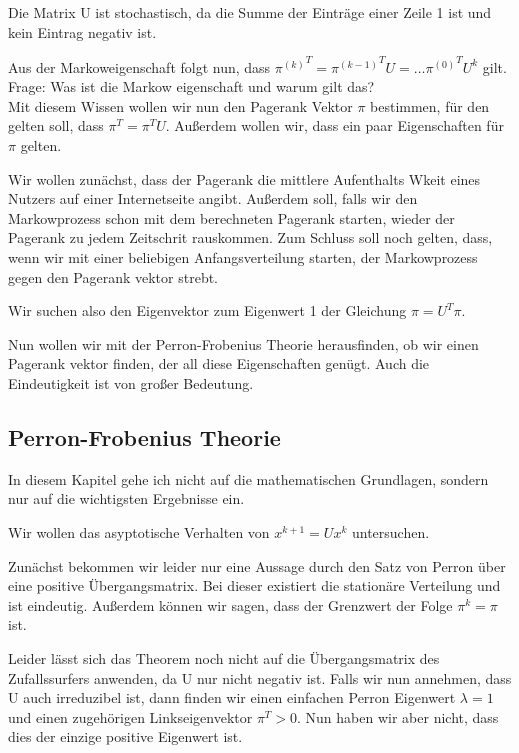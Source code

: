 \documentclass[]{article}
\begin{document}
Die Matrix U ist stochastisch, da die Summe der Einträge einer Zeile 1 ist und kein Eintrag negativ ist. 

Aus der Markoweigenschaft folgt nun, dass ${\pi^{(k)}}^T= {\pi^{(k-1)}}^T U = \dots {\pi^{(0)}}^T U^k$ gilt. \\

Frage: Was ist die Markow eigenschaft und warum gilt das? \\

Mit diesem Wissen wollen wir nun den Pagerank Vektor $\pi$ bestimmen, für den gelten soll, dass $\pi^T = \pi^T U$. Außerdem wollen wir, dass ein paar Eigenschaften für $\pi$ gelten. 

Wir wollen zunächst, dass der Pagerank die mittlere Aufenthalts Wkeit eines Nutzers auf einer Internetseite angibt. Außerdem soll, falls wir den Markowprozess schon mit dem berechneten Pagerank starten, wieder der Pagerank zu jedem Zeitschrit rauskommen. Zum Schluss soll noch gelten, dass, wenn wir mit einer beliebigen Anfangsverteilung starten, der Markowprozess gegen den Pagerank vektor strebt. 

Wir suchen also den Eigenvektor zum Eigenwert 1 der Gleichung $\pi = U^T \pi$. 

Nun wollen wir mit der Perron-Frobenius Theorie herausfinden, ob wir einen Pagerank vektor finden, der all diese Eigenschaften genügt. Auch die Eindeutigkeit ist von großer Bedeutung.

\subsection{Perron-Frobenius Theorie}

In diesem Kapitel gehe ich nicht auf die mathematischen Grundlagen, sondern nur auf die wichtigsten Ergebnisse ein. 

Wir wollen das asyptotische Verhalten von $x^{k+1}=U x^k$ untersuchen. 

Zunächst bekommen wir leider nur eine Aussage durch den Satz von Perron über eine positive Übergangsmatrix. Bei dieser existiert die stationäre Verteilung und ist eindeutig. Außerdem können wir sagen, dass der Grenzwert der Folge $\pi^k=\pi$ ist. 

Leider lässt sich das Theorem noch nicht auf die Übergangsmatrix des Zufallssurfers anwenden, da U nur nicht negativ ist. Falls wir nun annehmen, dass U auch irreduzibel ist, dann finden wir einen einfachen Perron Eigenwert $\lambda = 1$ und einen zugehörigen Linkseigenvektor $\pi^T>0$. Nun haben wir aber nicht, dass dies der einzige positive Eigenwert ist. \\
\end{document}
